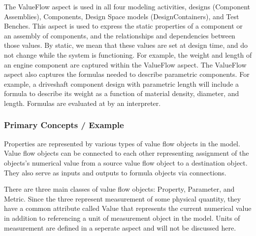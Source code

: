 
The ValueFlow aspect is used in all four modeling activities, designs (Component Assemblies), Components, Design Space models (DesignContainers), and Test Benches. This aspect is used to express the static properties of a component or an assembly of components, and the relationships and dependencies between those values. By static, we mean that these values are set at design time, and do not change while the system is functioning. For example, the weight and length of an engine component are captured within the ValueFlow aspect. The ValueFlow aspect also captures the formulas needed to describe parametric components. For example, a driveshaft component design with parametric length will include a formula to describe its weight as a function of material density, diameter, and length. Formulas are evaluated at by an interpreter.

\subsubsection{Primary Concepts / Example}
Properties are represented by various types of value flow objects in the model. Value flow objects can be connected to each other representing assignment of the objects's numerical value from a source value flow object to a destination object. They also serve as inputs and outputs to formula objects via connections.

There are three main classes of value flow objects: Property, Parameter, and Metric. Since the three represent measurement of some physical quantity, they have a common attribute called Value that represents the current numerical value in addition to referencing a unit of measurement object in the model. Units of measurement are defined in a seperate aspect and will not be discussed here.

